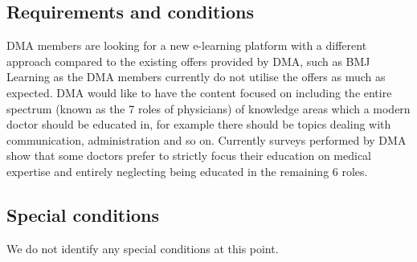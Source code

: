 \subsection{Requirements and conditions}
DMA members are looking for a new e-learning platform with a different approach compared to the existing offers provided by DMA, such as BMJ Learning as the DMA members currently do not utilise the offers as much as expected. DMA would like to have the content focused on including the entire spectrum (known as the 7 roles of physicians) of knowledge areas which a modern doctor should be educated in, for example there should be topics dealing with communication, administration and so on. Currently surveys performed by DMA show that some doctors prefer to strictly focus their education on medical expertise and entirely neglecting being educated in the remaining 6 roles.

\subsection{Special conditions}
We do not identify any special conditions at this point.

